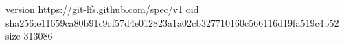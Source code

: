 version https://git-lfs.github.com/spec/v1
oid sha256:e11659ca80b91c9cf57d4e012823a1a02cb327710160c566116d19fa519c4b52
size 313086
